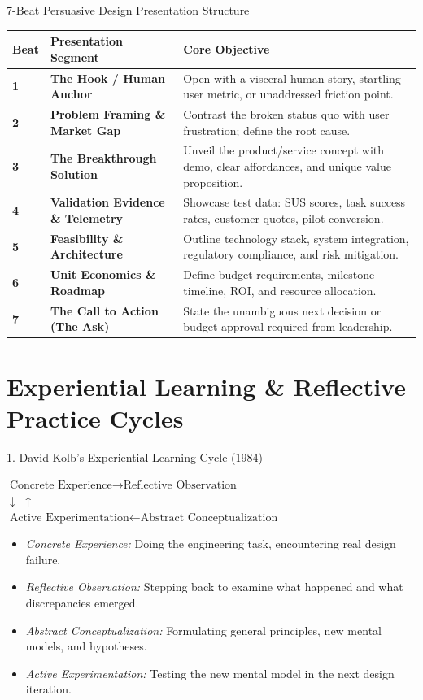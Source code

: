 \begin{canvasbox}{7-Beat Persuasive Design Presentation Structure}
\begin{tabularx}{\linewidth}{|l|l|X|} \hline
\textbf{Beat} & \textbf{Presentation Segment} & \textbf{Core Objective} \\ \hline
\textbf{1} & \textbf{The Hook / Human Anchor} & Open with a visceral human story, startling user metric, or unaddressed friction point. \\ \hline
\textbf{2} & \textbf{Problem Framing \& Market Gap} & Contrast the broken status quo with user frustration; define the root cause. \\ \hline
\textbf{3} & \textbf{The Breakthrough Solution} & Unveil the product/service concept with demo, clear affordances, and unique value proposition. \\ \hline
\textbf{4} & \textbf{Validation Evidence \& Telemetry} & Showcase test data: SUS scores, task success rates, customer quotes, pilot conversion. \\ \hline
\textbf{5} & \textbf{Feasibility \& Architecture} & Outline technology stack, system integration, regulatory compliance, and risk mitigation. \\ \hline
\textbf{6} & \textbf{Unit Economics \& Roadmap} & Define budget requirements, milestone timeline, ROI, and resource allocation. \\ \hline
\textbf{7} & \textbf{The Call to Action (The Ask)} & State the unambiguous next decision or budget approval required from leadership. \\ \hline
\end{tabularx}
\end{canvasbox}

\section{Experiential Learning \& Reflective Practice Cycles}

\begin{frameworkbox}{1. David Kolb's Experiential Learning Cycle (1984)}
\begin{center}
$\text{Concrete Experience} \to \text{Reflective Observation}$ \\
$\downarrow$ \hfill $\uparrow$ \\
$\text{Active Experimentation} \leftarrow \text{Abstract Conceptualization}$
\end{center}
\begin{itemize}
    \item \textit{Concrete Experience:} Doing the engineering task, encountering real design failure.
    \item \textit{Reflective Observation:} Stepping back to examine what happened and what discrepancies emerged.
    \item \textit{Abstract Conceptualization:} Formulating general principles, new mental models, and hypotheses.
    \item \textit{Active Experimentation:} Testing the new mental model in the next design iteration.
\end{itemize}
\end{frameworkbox}

